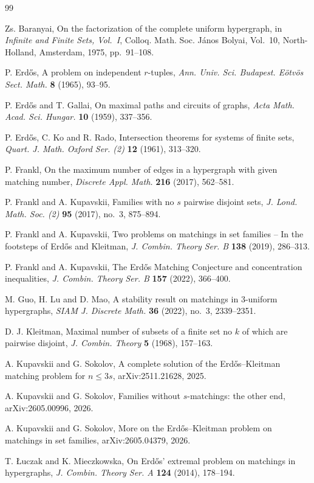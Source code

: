 \documentclass[10pt,a4paper]{article}
\numberwithin{equation}{section}
\theoremstyle{definition}
\begin{document}
\begin{thebibliography}{99}

    Zs. Baranyai,
    On the factorization of the complete uniform hypergraph,
    in \emph{Infinite and Finite Sets, Vol.~I},
    Colloq. Math. Soc. J\'anos Bolyai, Vol.~10,
    North-Holland, Amsterdam, 1975, pp.~91--108.

    P. Erd\H{o}s,
    A problem on independent $r$-tuples,
    \emph{Ann. Univ. Sci. Budapest. E\"otv\"os Sect. Math.} {\bf 8} (1965), 93--95.

    P. Erd\H{o}s and T. Gallai,
    On maximal paths and circuits of graphs,
    \emph{Acta Math. Acad. Sci. Hungar.} {\bf 10} (1959), 337--356.

    P. Erd\H{o}s, C. Ko and R. Rado,
    Intersection theorems for systems of finite sets,
    \emph{Quart. J. Math. Oxford Ser. (2)} {\bf 12} (1961), 313--320.

    P. Frankl,
    On the maximum number of edges in a hypergraph with given matching number,
    \emph{Discrete Appl. Math.} {\bf 216} (2017), 562--581.

    P. Frankl and A. Kupavskii,
    Families with no $s$ pairwise disjoint sets,
    \emph{J. Lond. Math. Soc. (2)} {\bf 95} (2017), no.~3, 875--894.

    P. Frankl and A. Kupavskii,
    Two problems on matchings in set families -- In the footsteps of
    Erd\H{o}s and Kleitman,
    \emph{J. Combin. Theory Ser. B} {\bf 138} (2019), 286--313.

    P. Frankl and A. Kupavskii,
    The Erd\H{o}s Matching Conjecture and concentration inequalities,
    \emph{J. Combin. Theory Ser. B} {\bf 157} (2022), 366--400.

    M. Guo, H. Lu and D. Mao,
    A stability result on matchings in $3$-uniform hypergraphs,
    \emph{SIAM J. Discrete Math.} {\bf 36} (2022), no.~3, 2339--2351.

    D. J. Kleitman,
    Maximal number of subsets of a finite set no $k$ of which are pairwise disjoint,
    \emph{J. Combin. Theory} {\bf 5} (1968), 157--163.

    A. Kupavskii and G. Sokolov,
    A complete solution of the Erd\H{o}s--Kleitman matching problem for $n\le3s$,
    arXiv:2511.21628, 2025.

    A. Kupavskii and G. Sokolov,
    Families without $s$-matchings: the other end,
    arXiv:2605.00996, 2026.

    A. Kupavskii and G. Sokolov,
    More on the Erd\H{o}s--Kleitman problem on matchings in set families,
    arXiv:2605.04379, 2026.

    T. \L{}uczak and K. Mieczkowska,
    On Erd\H{o}s' extremal problem on matchings in hypergraphs,
    \emph{J. Combin. Theory Ser. A} {\bf 124} (2014), 178--194.

\end{thebibliography}
\end{document}
